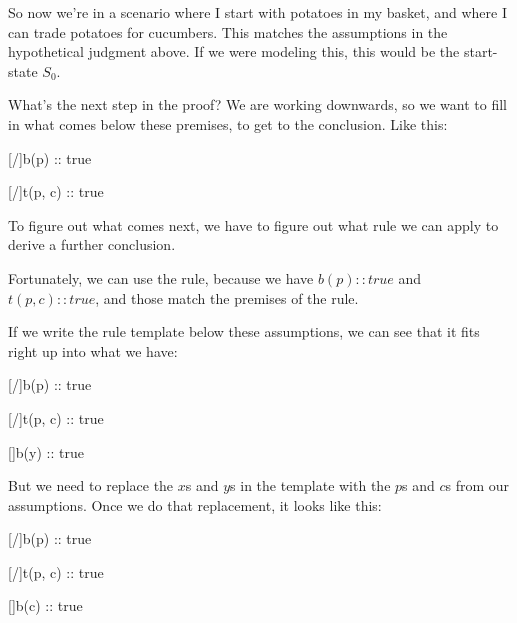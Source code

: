 \documentclass[../../../main.tex]{subfiles}
\begin{document}
\noindent
So now we're in a scenario where I start with potatoes in my basket, and where I can trade potatoes for cucumbers. This matches the assumptions in the hypothetical judgment above. If we were modeling this, this would be the start-state $S_{0}$.

What's the next step in the proof? We are working downwards, so we want to fill in what comes below these premises, to get to the conclusion. Like this:

\begin{prooftree*}
  \hypo{}
  [\startrule/]{b(p) :: true}
  \ellipsis{}{}

  \hypo{}
  [\startrule/]{t(p, c) :: true}

  \ellipsis{}{}
  

\end{prooftree*}

\noindent
To figure out what comes next, we have to figure out what rule we can apply to derive a further conclusion. 

Fortunately, we can use the  rule, because we have $b(p) :: true$ and $t(p, c) :: true$, and those match the premises of the  rule.

If we write the  rule template below these assumptions, we can see that it fits right up into what we have:

\begin{prooftree*}
  \hypo{}
  [\startrule/]{b(p) :: true}


  \hypo{}
  [\startrule/]{t(p, c) :: true}


  []{b(y) :: true}

\end{prooftree*}

\noindent
But we need to replace the $x$s and $y$s in the template with the $p$s and $c$s from our assumptions. Once we do that replacement, it looks like this:

\begin{prooftree*}
  \hypo{}
  [\startrule/]{b(p) :: true}


  \hypo{}
  [\startrule/]{t(p, c) :: true}


  []{b(c) :: true}

\end{prooftree*}
\end{document}
